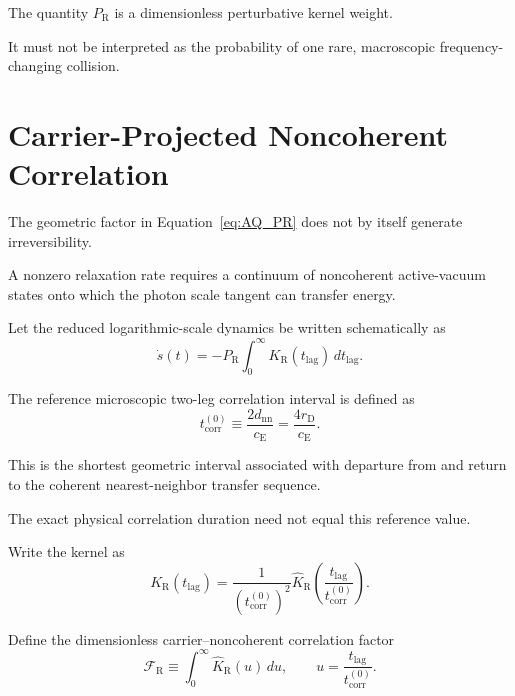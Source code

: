 The quantity $P_{\mathrm R}$ is a dimensionless perturbative kernel weight.

It must not be interpreted as the probability of one rare, macroscopic
frequency-changing collision.


\section{Carrier-Projected Noncoherent Correlation}

The geometric factor in Equation~\eqref{eq:AQ_PR} does not by itself generate
irreversibility.

A nonzero relaxation rate requires a continuum of noncoherent active-vacuum
states onto which the photon scale tangent can transfer energy.

Let the reduced logarithmic-scale dynamics be written schematically as
\begin{equation}
    \dot s(t)
    =
    -
    P_{\mathrm R}
    \int_0^{\infty}
    K_{\mathrm R}(t_{\mathrm{lag}})
    \,dt_{\mathrm{lag}}.
    \label{eq:AQ_kernel_equation}
\end{equation}

The reference microscopic two-leg correlation interval is defined as
\begin{equation}
    \boxed{
    t_{\mathrm{corr}}^{(0)}
    \equiv
    \frac{2d_{\mathrm{nn}}}{c_{\mathrm E}}
    =
    \frac{4r_{\mathrm D}}{c_{\mathrm E}}.
    }
    \label{eq:AQ_tau0}
\end{equation}

This is the shortest geometric interval associated with departure from and
return to the coherent nearest-neighbor transfer sequence.

The exact physical correlation duration need not equal this reference value.

Write the kernel as
\begin{equation}
    K_{\mathrm R}(t_{\mathrm{lag}})
    =
    \frac{1}{
        \left(
            t_{\mathrm{corr}}^{(0)}
        \right)^2
    }
    \widehat K_{\mathrm R}
    \left(
        \frac{t_{\mathrm{lag}}}{
            t_{\mathrm{corr}}^{(0)}
        }
    \right).
    \label{eq:AQ_kernel_scaled}
\end{equation}

Define the dimensionless carrier--noncoherent correlation factor
\begin{equation}
    \boxed{
    \mathcal F_{\mathrm R}
    \equiv
    \int_0^{\infty}
    \widehat K_{\mathrm R}(u)\,du,
    \qquad
    u
    =
    \frac{t_{\mathrm{lag}}}{t_{\mathrm{corr}}^{(0)}}.
    }
    \label{eq:AQ_FRdef}
\end{equation}

